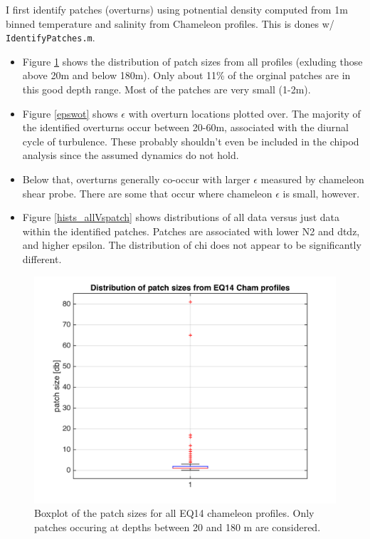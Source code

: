 \documentclass[11pt]{article}
\begin{document}
I first identify patches (overturns) using potnential density computed from 1m binned temperature and salinity from Chameleon profiles. This is dones w/ \verb+IdentifyPatches.m+.

\begin{itemize}
\item Figure \ref{psizebox} shows the distribution of patch sizes from all profiles (exluding those above 20m and below 180m). Only about 11\% of the orginal patches are in this good depth range. Most of the patches are very small (1-2m).
\item Figure \ref{epswot} shows $\epsilon$ with overturn locations plotted over. The majority of the identified overturns occur between 20-60m, associated with the diurnal cycle of turbulence. These probably shouldn't even be included in the chipod analysis since the assumed dynamics do not hold.
\item Below that, overturns generally co-occur with larger $\epsilon$ measured by chameleon shear probe. There are some that occur where chameleon $\epsilon$ is small, however.
\item Figure \ref{hists_allVspatch} shows distributions of all data versus just data within the identified patches. Patches are associated with lower N2 and dtdz, and higher epsilon. The distribution of chi does not appear to be significantly different.
\end{itemize}


\begin{figure}[htbp]
\includegraphics[scale=0.8]{GamByPatch_patchsize_boxplot.png}
\caption{Boxplot of the patch sizes for all EQ14 chameleon profiles. Only patches occuring at depths between 20 and 180 m are considered.}
\label{psizebox}
\end{figure}
\end{document}
